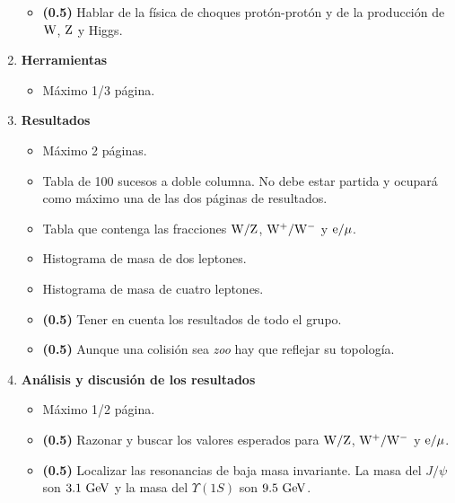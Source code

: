 \documentclass[11pt]{articulo}
\begin{document}
\begin{enumerate}
\begin{itemize}
\item {\bf (0.5)} Hablar de la f\'isica de choques prot\'on-prot\'on y de la producci\'on de ${\rm W}$, ${\rm Z}$ y Higgs.

\end{itemize}

\item {\bf Herramientas}

\begin{itemize}

\item M\'aximo 1/3 p\'agina.

\end{itemize}

\item {\bf Resultados}

\begin{itemize}

\item M\'aximo 2 p\'aginas.

\item Tabla de 100 sucesos a doble columna. No debe estar partida y ocupar\'a como m\'aximo una de las dos p\'aginas de resultados.

\item Tabla que contenga las fracciones ${\rm W/Z}$, ${\rm W^+/W^-}$ y ${\rm e/\mu}$.

\item Histograma de masa de dos leptones.

\item Histograma de masa de cuatro leptones.

\item {\bf (0.5)} Tener en cuenta los resultados de todo el grupo.

\item {\bf (0.5)} Aunque una colisi\'on sea {\it zoo} hay que reflejar su topolog\'ia.

\end{itemize}

\item {\bf An\'alisis y discusi\'on de los resultados}

\begin{itemize}

\item M\'aximo 1/2 p\'agina.

\item {\bf (0.5)} Razonar y buscar los valores esperados para ${\rm W/Z}$, ${\rm W^+/W^-}$ y ${\rm e/\mu}$.

\item {\bf (0.5)} Localizar las resonancias de baja masa invariante. La masa del $J/\psi$ son ${\rm 3.1~GeV}$ y la masa del $\Upsilon(1S)$ son ${\rm 9.5~GeV}$.


\end{itemize}
\end{enumerate}
\end{document}
